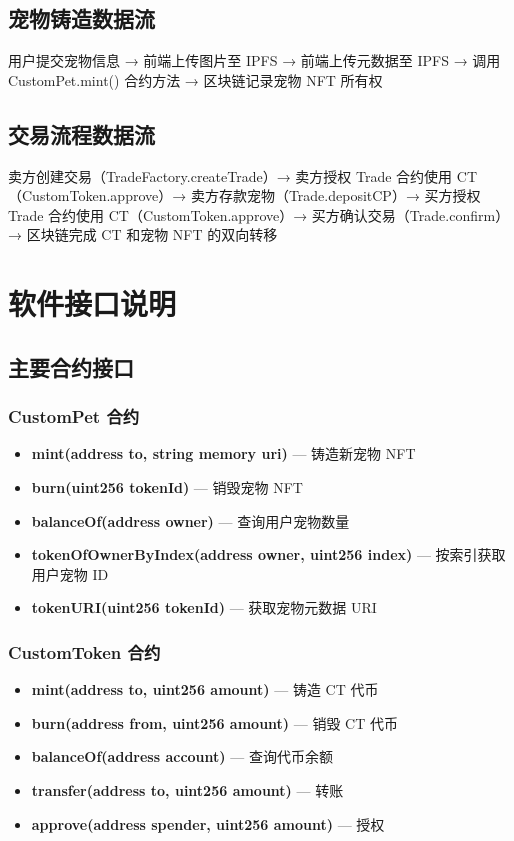 \documentclass{mancls}
\begin{document}
\subsection{宠物铸造数据流}

用户提交宠物信息 → 前端上传图片至 IPFS → 前端上传元数据至 IPFS → 调用 CustomPet.mint() 合约方法 → 区块链记录宠物 NFT 所有权

\subsection{交易流程数据流}

卖方创建交易（TradeFactory.createTrade）→ 卖方授权 Trade 合约使用 CT（CustomToken.approve）→ 卖方存款宠物（Trade.depositCP）→ 买方授权 Trade 合约使用 CT（CustomToken.approve）→ 买方确认交易（Trade.confirm）→ 区块链完成 CT 和宠物 NFT 的双向转移

\section{软件接口说明}

\subsection{主要合约接口}

\subsubsection{CustomPet 合约}
\begin{itemize}
	\item \textbf{mint(address to, string memory uri)} — 铸造新宠物 NFT
	\item \textbf{burn(uint256 tokenId)} — 销毁宠物 NFT
	\item \textbf{balanceOf(address owner)} — 查询用户宠物数量
	\item \textbf{tokenOfOwnerByIndex(address owner, uint256 index)} — 按索引获取用户宠物 ID
	\item \textbf{tokenURI(uint256 tokenId)} — 获取宠物元数据 URI
\end{itemize}

\subsubsection{CustomToken 合约}
\begin{itemize}
	\item \textbf{mint(address to, uint256 amount)} — 铸造 CT 代币
	\item \textbf{burn(address from, uint256 amount)} — 销毁 CT 代币
	\item \textbf{balanceOf(address account)} — 查询代币余额
	\item \textbf{transfer(address to, uint256 amount)} — 转账
	\item \textbf{approve(address spender, uint256 amount)} — 授权
\end{itemize}
\end{document}
